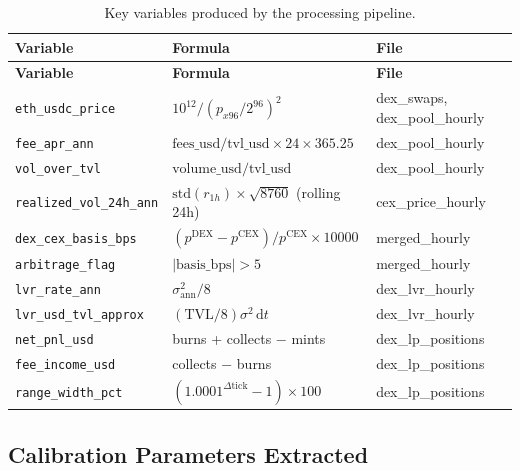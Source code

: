 \documentclass[11pt,a4paper]{article}
\begin{document}
\begin{longtable}{L{4.2cm}L{4.0cm}L{6.4cm}}
\caption{Key variables produced by the processing pipeline.}\\
\toprule
\textbf{Variable} & \textbf{Formula} & \textbf{File} \\
\midrule
\endfirsthead
\toprule
\textbf{Variable} & \textbf{Formula} & \textbf{File} \\
\midrule
\endhead
\bottomrule
\endfoot
\texttt{eth\_usdc\_price} & $10^{12}/(p_{x96}/2^{96})^2$ & dex\_swaps, dex\_pool\_hourly \\
\texttt{fee\_apr\_ann} & $\text{fees\_usd}/\text{tvl\_usd} \times 24 \times 365.25$ & dex\_pool\_hourly \\
\texttt{vol\_over\_tvl} & $\text{volume\_usd}/\text{tvl\_usd}$ & dex\_pool\_hourly \\
\texttt{realized\_vol\_24h\_ann} & $\mathrm{std}(r_{1h}) \times \sqrt{8760}$ (rolling 24h) & cex\_price\_hourly \\
\texttt{dex\_cex\_basis\_bps} & $(p^{\mathrm{DEX}}-p^{\mathrm{CEX}})/p^{\mathrm{CEX}} \times 10000$ & merged\_hourly \\
\texttt{arbitrage\_flag} & $|\text{basis\_bps}|>5$ & merged\_hourly \\
\texttt{lvr\_rate\_ann} & $\sigma^2_{\mathrm{ann}}/8$ & dex\_lvr\_hourly \\
\texttt{lvr\_usd\_tvl\_approx} & $(\mathrm{TVL}/8)\sigma^2 \,\mathrm{d}t$ & dex\_lvr\_hourly \\
\texttt{net\_pnl\_usd} & burns + collects $-$ mints & dex\_lp\_positions \\
\texttt{fee\_income\_usd} & collects $-$ burns & dex\_lp\_positions \\
\texttt{range\_width\_pct} & $(1.0001^{\Delta\text{tick}}-1)\times 100$ & dex\_lp\_positions \\
\end{longtable}

\subsection{Calibration Parameters Extracted}
\end{document}
